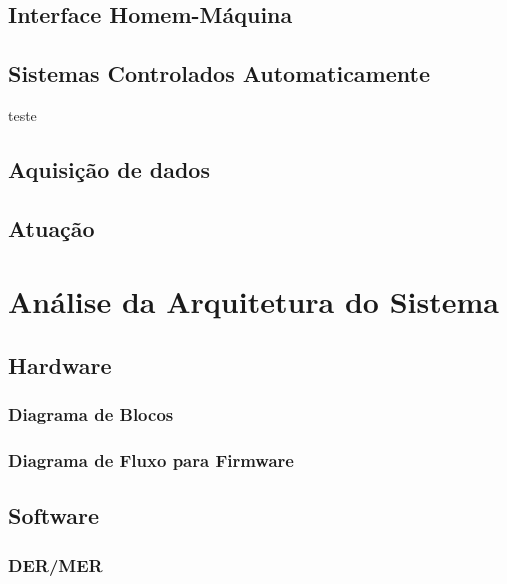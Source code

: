 \subsection{Interface Homem-Máquina}
\subsection{Sistemas Controlados Automaticamente}
teste
\subsection{Aquisição de dados}
\subsection{Atuação}


\section{Análise da Arquitetura do Sistema}
\subsection{Hardware}
\subsubsection{Diagrama de Blocos}
\subsubsection{Diagrama de Fluxo para Firmware}

\subsection{Software}
\subsubsection{DER/MER}


